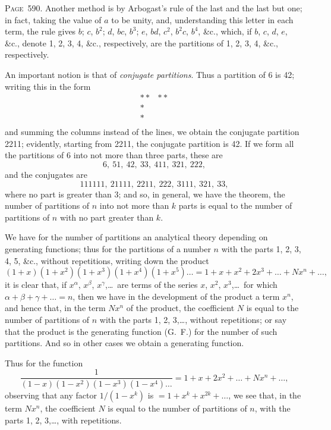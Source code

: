 \documentclass[11pt,a4paper]{article}
\theoremstyle{definition}
\begin{document}
\newpage
\noindent\textsc{Page~590.} Another method is by Arbogast's rule of the last and the last but one; in fact, taking the value of $a$ to be unity, and, understanding this letter in each term, the rule gives $b$; $c$, $b^2$; $d$, $bc$, $b^3$; $e$, $bd$, $c^2$, $b^2c$, $b^4$, \&c., which, if $b$, $c$, $d$, $e$, \&c., denote 1, 2, 3, 4, \&c., respectively, are the partitions of 1, 2, 3, 4, \&c., respectively.

An important notion is that of \textit{conjugate partitions}. Thus a partition of 6 is 42; writing this in the form
\[
\begin{array}{cc}
** & ** \\
* & \\
* & \\
\end{array}
\]
and summing the columns instead of the lines, we obtain the conjugate partition 2211; evidently, starting from 2211, the conjugate partition is 42. If we form all the partitions of 6 into not more than three parts, these are
\[
6,\ 51,\ 42,\ 33,\ 411,\ 321,\ 222,
\]
and the conjugates are
\[
111111,\ 21111,\ 2211,\ 222,\ 3111,\ 321,\ 33,
\]
where no part is greater than 3; and so, in general, we have the theorem, the number of partitions of $n$ into not more than $k$ parts is equal to the number of partitions of $n$ with no part greater than $k$.

We have for the number of partitions an analytical theory depending on generating functions; thus for the partitions of a number $n$ with the parts 1, 2, 3, 4, 5, \&c., without repetitions, writing down the product
\[
(1+x)(1+x^2)(1+x^3)(1+x^4)(1+x^5)\ldots = 1+x+x^2+2x^3+\ldots +Nx^n+\ldots,
\]
it is clear that, if $x^\alpha$, $x^\beta$, $x^\gamma$,\ldots\ are terms of the series $x$, $x^2$, $x^3$,\ldots\ for which $\alpha+\beta+\gamma+\ldots=n$, then we have in the development of the product a term $x^n$, and hence that, in the term $Nx^n$ of the product, the coefficient $N$ is equal to the number of partitions of $n$ with the parts 1, 2, 3,\ldots, without repetitions; or say that the product is the generating function (G.\ F.) for the number of such partitions. And so in other cases we obtain a generating function.

Thus for the function
\[
\frac{1}{(1-x)(1-x^2)(1-x^3)(1-x^4)\ldots} = 1+x+2x^2+\ldots+Nx^n+\ldots,
\]
observing that any factor $1/(1-x^k)$ is $=1+x^k+x^{2k}+\ldots$, we see that, in the term $Nx^n$, the coefficient $N$ is equal to the number of partitions of $n$, with the parts 1, 2, 3,\ldots, with repetitions.
\end{document}
